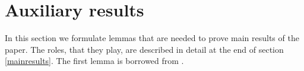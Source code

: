 \documentclass[twoside,11pt]{article}
\begin{document}






 



\appendix
\section{Auxiliary results}
\label{auxresults}

In this section we formulate lemmas that are needed to prove main results of the paper. The roles, that they play, are described in detail at the end of section \ref{mainresults}.
The first lemma is borrowed from \citet[Lemma 3.1]{Cox13}.
\end{document}
